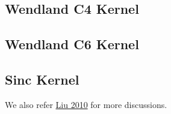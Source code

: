 \documentclass[notes.tex]{subfiles}
\begin{document}
\subsection{Wendland C4 Kernel}

\subsection{Wendland C6 Kernel}

\subsection{Sinc Kernel}

We also refer \href{https://pdfs.semanticscholar.org/6ae2/960b7cbeab3e1969033b343dbe3594c99cb3.pdf}{Liu 2010} for more discussions.

\end{document}
